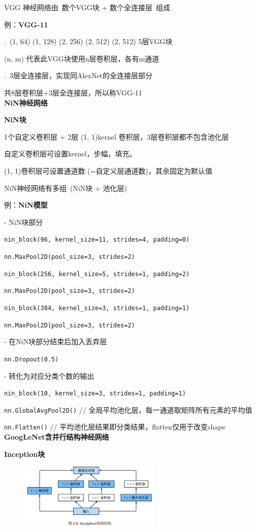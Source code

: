 \documentclass[UTF8]{ctexart}
\begin{document}
  VGG 神经网络由\ 数个VGG块 + 数个全连接层\ 组成

  例：\textbf{VGG-11}
  
  .\ (1, 64) (1, 128) (2, 256) (2, 512) (2, 512) 5层VGG块

  \quad \quad (n, m) 代表此VGG块使用n层卷积层，各有m通道
  
  .\ 3层全连接层，实现同AlexNet的全连接层部分
  
  \quad 共8层卷积层+3层全连接层，所以称VGG-11\\
\textbf{NiN神经网络}

  \textbf{NiN块}

  \quad 1个自定义卷积层 + 2层 (1, 1)kernel 卷积层，3层卷积层都不包含池化层

  \quad 自定义卷积层可设置kernel，步幅，填充。
  
  \quad (1, 1)卷积层可设置通道数 (=自定义层通道数)，其余固定为默认值

  NiN神经网络有多组\ (NiN块 + 池化层)
  
  例：\textbf{NiN模型}

  \quad - NiN块部分

  \quad \texttt{nin\_block(96, kernel\_size=11, strides=4, padding=0)}

  \quad \texttt{nn.MaxPool2D(pool\_size=3, strides=2)}

  \quad \texttt{nin\_block(256, kernel\_size=5, strides=1, padding=2)}

  \quad \texttt{nn.MaxPool2D(pool\_size=3, strides=2)}

  \quad \texttt{nin\_block(384, kernel\_size=3, strides=1, padding=1)}

  \quad \texttt{nn.MaxPool2D(pool\_size=3, strides=2)}

  \quad - 在NiN块部分结束后加入丢弃层

  \quad \texttt{nn.Dropout(0.5)}

  \quad - 转化为对应分类个数的输出

  \quad \texttt{nin\_block(10, kernel\_size=3, strides=1, padding=1)}

  \quad \texttt{nn.GlobalAvgPool2D()} // 全局平均池化层，每一通道取矩阵所有元素的平均值

  \quad \texttt{nn.Flatten()} // 平均池化层结果即分类结果，flatten仅用于改变shape\\
\textbf{GoogLeNet含并行结构神经网络}

  \textbf{Inception块}
  \begin{figure}[H] %
    \centering %
    \includegraphics[width=0.6\textwidth]{note_images/inception_block.png} %
  \end{figure}
\end{document}
